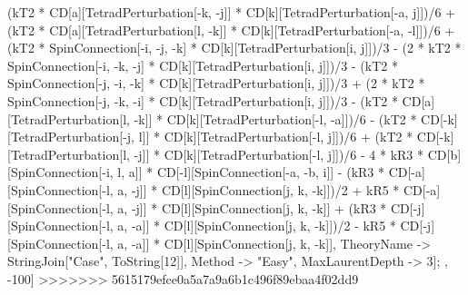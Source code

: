 (kT2 * CD[a][TetradPerturbation[-k, -j]] * CD[k][TetradPerturbation[-a, j]])/6 + (kT2 * CD[a][TetradPerturbation[l, -k]] * CD[k][TetradPerturbation[-a, -l]])/6 + (kT2 * SpinConnection[-i, -j, -k] * CD[k][TetradPerturbation[i, j]])/3 - (2 * kT2 * SpinConnection[-i, -k, -j] * CD[k][TetradPerturbation[i, j]])/3 - (kT2 * SpinConnection[-j, -i, -k] * CD[k][TetradPerturbation[i, j]])/3 + (2 * kT2 * SpinConnection[-j, -k, -i] * CD[k][TetradPerturbation[i, j]])/3 - (kT2 * CD[a][TetradPerturbation[l, -k]] * CD[k][TetradPerturbation[-l, -a]])/6 - (kT2 * CD[-k][TetradPerturbation[-j, l]] * CD[k][TetradPerturbation[-l, j]])/6 + (kT2 * CD[-k][TetradPerturbation[l, -j]] * CD[k][TetradPerturbation[-l, j]])/6 - 4 * kR3 * CD[b][SpinConnection[-i, l, a]] * CD[-l][SpinConnection[-a, -b, i]] - (kR3 * CD[-a][SpinConnection[-l, a, -j]] * CD[l][SpinConnection[j, k, -k]])/2 + kR5 * CD[-a][SpinConnection[-l, a, -j]] * CD[l][SpinConnection[j, k, -k]] + (kR3 * CD[-j][SpinConnection[-l, a, -a]] * CD[l][SpinConnection[j, k, -k]])/2 - kR5 * CD[-j][SpinConnection[-l, a, -a]] * CD[l][SpinConnection[j, k, -k]], TheoryName -> StringJoin["Case", ToString[12]], Method -> "Easy", MaxLaurentDepth -> 3]; , -100]
>>>>>>> 5615179efce0a5a7a9a6b1c496f89ebaa4f02dd9
